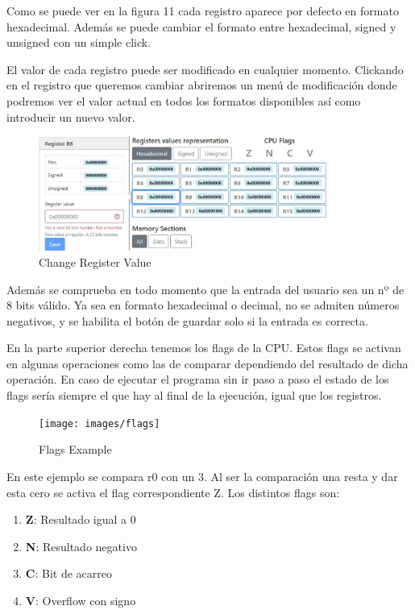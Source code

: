 {{            Como se puede ver en la figura 11 cada registro aparece por defecto en formato hexadecimal.
            Además se puede cambiar el formato entre hexadecimal, signed y unsigned con un simple click.

            El valor de cada registro puede ser modificado en cualquier momento. Clickando en el registro
            que queremos cambiar abriremos un menú de modificación donde podremos ver el valor actual en
            todos los formatos disponibles así como introducir un nuevo valor.

            \begin{figure}[h]
                \centering
                \includegraphics[width=0.85\textwidth]{images/modifyregister}
                \caption{Change Register Value}
            \end{figure}

            Además se comprueba en todo momento que la entrada del usuario sea un nº de 8 bits válido.
            Ya sea en formato hexadecimal o decimal, no se admiten números negativos, y se habilita el botón
            de guardar solo si la entrada es correcta.

            En la parte superior derecha tenemos los flags de la CPU. Estos flags se activan en algunas operaciones
            como las de comparar dependiendo del resultado de dicha operación. En caso de ejecutar el programa sin ir
            paso a paso el estado de los flags sería siempre el que hay al final de la ejecución, 
            igual que los registros.

            \begin{figure}[h]
                \centering
                \texttt{[image: images/flags]}
                \caption{Flags Example}
            \end{figure}

            En este ejemplo se compara r0 con un 3. Al ser la comparación una resta y dar esta cero se activa
            el flag correspondiente Z. Los distintos flags son:
            \begin{enumerate}
                \item \textbf{Z}: Resultado igual a 0
                \item \textbf{N}: Resultado negativo
                \item \textbf{C}: Bit de acarreo
                \item \textbf{V}: Overflow con signo
            \end{enumerate}


}}
